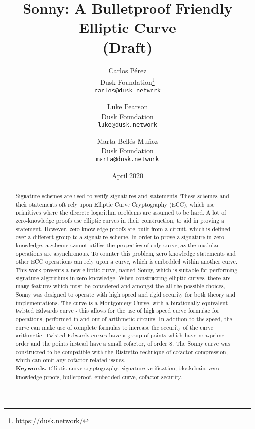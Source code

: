 \documentclass{article}
\theoremstyle{definition}
\theoremstyle{remark}
\begin{document}
	
	\title{Sonny: A Bulletproof Friendly Elliptic Curve\\
	(Draft)}
	\author{
		Carlos Pérez\\
		{\small Dusk Foundation\footnote{https://dusk.network/}}\\
		\texttt{\small carlos@dusk.network}
		\and
		Luke Pearson\\
		{\small Dusk Foundation}\\
		\texttt{\small luke@dusk.network}
		\and
		Marta Bell\'es-Mu\~noz\\
		{\small Dusk Foundation}\\
		\texttt{\small marta@dusk.network}
	}
	
	\date{April 2020}
	
	\maketitle
	
	\begin{abstract}
		
		Signature schemes are used to verify signatures and statements. These schemes and their statements oft rely upon Elliptic Curve Cryptography (ECC), which use primitives where the discrete logarithm problems are assumed to be hard. A lot of zero-knowledge proofs use elliptic curves in their construction, to aid in proving a statement. However, zero-knowledge proofs are built from a circuit, which is defined over a different group to a signature scheme. In order to prove a signature in zero knowledge, a scheme cannot utilise the properties of only curve, as the modular operations are asynchronous. To counter this problem, zero knowledge statements and other ECC operations can rely upon a curve, which is embedded within another curve. This work presents a new elliptic curve, named Sonny, which is suitable for performing signature algorithms in zero-knowledge. When constructing elliptic curves, there are many features which must be considered and amongst the all the possible choices, Sonny was designed to operate with high speed and rigid security for both theory and implementations. The curve is a Montgomery Curve, with a birationally equivalent twisted Edwards curve - this allows for the use of high speed curve formulae for operations, performed in and out of arithmetic circuits. In addition to the speed, the curve can make use of complete formulas to increase the security of the curve arithmetic. Twisted Edwards curves have a group of points which have non-prime order and the points instead have a small cofactor, of order 8. The Sonny curve was constructed to be compatible with the Ristretto technique of cofactor compression, which can omit any cofactor related issues.\\
		
		{\bf Keywords:} Elliptic curve cryptography, signature verification, blockchain, zero-knowledge proofs, bulletproof, embedded curve, cofactor security. \\
		
	\end{abstract}
	
\end{document}
